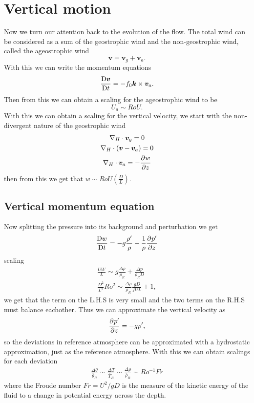 \section{Vertical motion}
Now we turn our attention back to the evolution of the flow. The total wind can be considered as a sum of the geostrophic wind and the non-geostrophic wind, called the ageostrophic wind $$\bm{v}=\bm{v}_g+\bm{v}_a.$$ With this we can write the momentum equations 
\begin{gather*}
    \displaystyle \frac{{\rm D} \bm{v}}{{\rm D} t}=-f_0\bm{k}\times\bm{v}_a.
\end{gather*}
Then from this we can obtain a scaling for the ageostrophic wind to be $$U_a\sim RoU.$$ With this we can obtain a scaling for the vertical velocity, we start with the non-divergent nature of the geostrophic wind 
\begin{gather*}
    \nabla_H\cdot\bm{v}_g = 0 \\
    \nabla_H\cdot(\bm{v}-\bm{v}_a)=0\\
    \nabla_H\cdot\bm{v}_a=-\displaystyle \frac{\partial^{} w}{\partial z^{}}
\end{gather*}
then from this we get that $w\sim RoU\left(\displaystyle \frac{D}{L}\right).$
\subsection{Vertical momentum equation}
Now splitting the pressure into its background and perturbation we get 
\begin{gather*}
    \displaystyle \frac{{\rm D} w}{{\rm D} t}=-g\frac{\rho'}{\rho}-\frac{1}{\rho}\displaystyle \frac{\partial^{} p'}{\partial z^{}}
\end{gather*}
scaling 
\begin{gather*}
    \frac{UW}{L} \sim g \frac{\Delta\rho}{\overline{\rho}_R}+\frac{\Delta p}{\overline{\rho}_R D} \\[0.25cm]
    \frac{D^2}{L^2}Ro^2 \sim \frac{\Delta\rho}{\overline{\rho}_R}\frac{gD}{fUL}+1,
\end{gather*}
we get that the term on the L.H.S is very small and the two terms on the R.H.S must balance eachother. Thus we can approximate the vertical velocity as 
\begin{gather*}
    \displaystyle \frac{\partial^{} p'}{\partial z^{}}=-g\rho',
\end{gather*}
so the deviations in reference atmosphere can be approximated with a hydrostatic approximation, just as the reference atmosphere. With this we can obtain scalings for each deviation 
\begin{gather*}
    \frac{\Delta\theta}{\overline{\theta}_R}\sim\frac{\Delta T}{\overline{T}_R}\sim\frac{\Delta\rho}{\overline{\rho}_R}\sim Ro^{-1}Fr
\end{gather*}
where the Froude number $Fr=U^2/gD$ is the measure of the kinetic energy of the fluid to a change in potential energy across the depth. 
